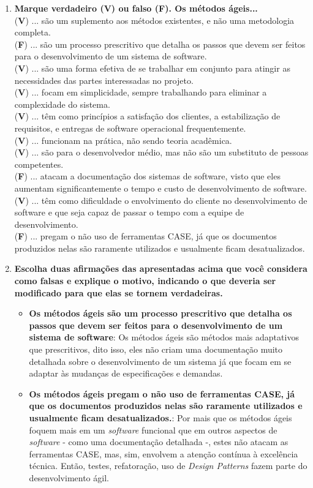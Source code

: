 \documentclass[12pt, a4paper]{article}
\newcommand{\tit}[1]{\textit{#1}}
\newcommand{\tb}[1]{\textbf{#1}}
\newcommand{\ssw}{\tit{software} }
\newcommand{\question}[1]{\item \tb{#1}}
\newcommand{\answer}[1]{\par #1}
\begin{document}
\begin{enumerate}[label=\textbf{\arabic*.}]
        \question{Marque verdadeiro (V) ou falso (F). Os métodos ágeis...} \\
        (\tb{V}) ... são um suplemento aos métodos existentes, e não uma metodologia completa. \\
        (\tb{F}) ... são um processo prescritivo que detalha os passos que devem ser feitos para o desenvolvimento de um sistema de software. \\
        (\tb{V}) ... são uma forma efetiva de se trabalhar em conjunto para atingir as necessidades das partes interessadas no projeto. \\
        (\tb{V}) ... focam em simplicidade, sempre trabalhando para eliminar a complexidade do sistema. \\
        (\tb{V}) ... têm como princípios a satisfação dos clientes, a estabilização de requisitos, e entregas de software operacional frequentemente. \\
        (\tb{V}) ... funcionam na prática, não sendo teoria acadêmica. \\
        (\tb{V}) ... são para o desenvolvedor médio, mas não são um substituto de pessoas competentes. \\
        (\tb{F}) ... atacam a documentação dos sistemas de software, visto que eles aumentam significantemente o
tempo e custo de desenvolvimento de software. \\
        (\tb{V}) ... têm como dificuldade o envolvimento do cliente no desenvolvimento de software e que seja capaz de passar o tempo com a equipe de desenvolvimento. \\
        (\tb{F}) ... pregam o não uso de ferramentas CASE, já que os documentos produzidos nelas são raramente utilizados e usualmente ficam desatualizados. \\
    
        \question{Escolha duas afirmações das apresentadas acima que você considera como falsas e explique o motivo, indicando o que deveria ser modificado para que elas se tornem verdadeiras.}
        \answer{
        \begin{itemize}
            \item \tb{Os métodos ágeis são um processo prescritivo que detalha os passos que devem ser feitos para o desenvolvimento de um sistema de software}: Os métodos ágeis são métodos mais adaptativos que prescritivos, dito isso, eles não criam uma documentação muito detalhada sobre o desenvolvimento de um sistema já que focam em se adaptar às mudanças de especificações e demandas. 
            \item \tb{Os métodos ágeis pregam o não uso de ferramentas CASE, já que os documentos produzidos nelas são raramente utilizados e usualmente ficam desatualizados.}: Por mais que os métodos ágeis foquem mais em um \ssw funcional que em outros aspectos de \ssw - como uma documentação detalhada -, estes não atacam as ferramentas CASE, mas, sim, envolvem a atenção contínua à excelência técnica. Então, testes, refatoração, uso de \tit{Design Patterns} fazem parte do desenvolvimento ágil.
        \end{itemize}
        }
        

\end{enumerate}
\end{document}
